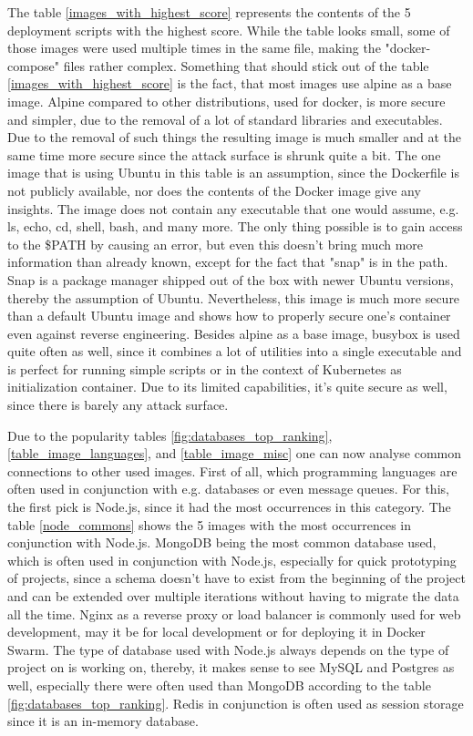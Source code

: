 The table \ref{images_with_highest_score} represents the contents of the 5 deployment scripts with the highest score. While the table looks small, some of those images were used multiple times in the same file, making the "docker-compose" files rather complex.
Something that should stick out of the table \ref{images_with_highest_score} is the fact, that most images use alpine as a base image. Alpine compared to other distributions, used for docker, is more secure and simpler, due to the removal of a lot of standard libraries and executables. Due to the removal of such things the resulting image is much smaller and at the same time more secure since the attack surface is shrunk quite a bit.
The one image that is using Ubuntu in this table is an assumption, since the Dockerfile is not publicly available, nor does the contents of the Docker image give any insights. The image does not contain any executable that one would assume, e.g. ls, echo, cd, shell, bash, and many more. The only thing possible is to gain access to the \$PATH by causing an error, but even this doesn't bring much more information than already known, except for the fact that "snap" is in the path. Snap is a package manager shipped out of the box with newer Ubuntu versions, thereby the assumption of Ubuntu. Nevertheless, this image is much more secure than a default Ubuntu image and shows how to properly secure one's container even against reverse engineering.
Besides alpine as a base image, busybox is used quite often as well, since it combines a lot of utilities into a single executable and is perfect for running simple scripts or in the context of Kubernetes as initialization container. Due to its limited capabilities, it's quite secure as well, since there is barely any attack surface.

Due to the popularity tables \ref{fig:databases_top_ranking}, \ref{table_image_languages}, and \ref{table_image_misc} one can now analyse common connections to other used images. First of all, which programming languages are often used in conjunction with e.g. databases or even message queues.
For this, the first pick is Node.js, since it had the most occurrences in this category. The table \ref{node_commons} shows the 5 images with the most occurrences in conjunction with Node.js. MongoDB being the most common database used, which is often used in conjunction with Node.js, especially for quick prototyping of projects, since a schema doesn't have to exist from the beginning of the project and can be extended over multiple iterations without having to migrate the data all the time. Nginx as a reverse proxy or load balancer is commonly used for web development, may it be for local development or for deploying it in Docker Swarm. The type of database used with Node.js always depends on the type of project on is working on, thereby, it makes sense to see MySQL and Postgres as well, especially there were often used than MongoDB according to the table \ref{fig:databases_top_ranking}. Redis in conjunction is often used as session storage since it is an in-memory database.

